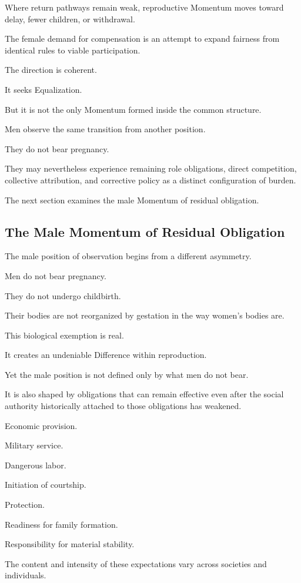 Where return pathways remain weak, reproductive Momentum moves toward delay, fewer children, or withdrawal.

The female demand for compensation is an attempt to expand fairness from identical rules to viable participation.

The direction is coherent.

It seeks Equalization.

But it is not the only Momentum formed inside the common structure.

Men observe the same transition from another position.

They do not bear pregnancy.

They may nevertheless experience remaining role obligations, direct competition, collective attribution, and corrective policy as a distinct configuration of burden.

The next section examines the male Momentum of residual obligation.

\subsection*{\textbf{The Male Momentum of Residual Obligation}} 

The male position of observation begins from a different asymmetry.

Men do not bear pregnancy.

They do not undergo childbirth.

Their bodies are not reorganized by gestation in the way women’s bodies are.

This biological exemption is real.

It creates an undeniable Difference within reproduction.

Yet the male position is not defined only by what men do not bear.

It is also shaped by obligations that can remain effective even after the social authority historically attached to those obligations has weakened.

Economic provision.

Military service.

Dangerous labor.

Initiation of courtship.

Protection.

Readiness for family formation.

Responsibility for material stability.

The content and intensity of these expectations vary across societies and individuals.

